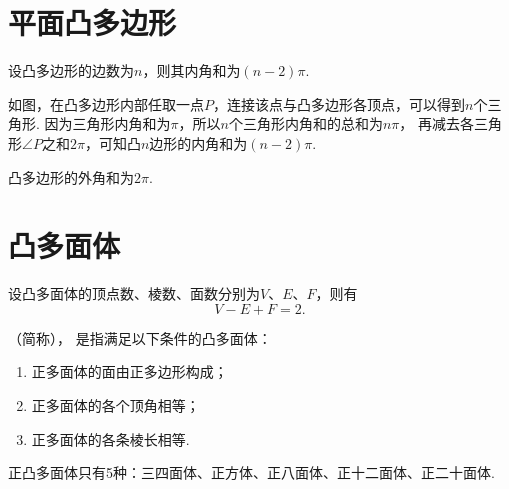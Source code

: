 \section{平面凸多边形}
\begin{theorem}
设凸多边形的边数为\(n\)，则其内角和为\((n-2)\pi\).
\end{theorem}
如图，在凸多边形内部任取一点\(P\)，连接该点与凸多边形各顶点，可以得到\(n\)个三角形.
因为三角形内角和为\(\pi\)，所以\(n\)个三角形内角和的总和为\(n\pi\)，
再减去各三角形\(\angle P\)之和\(2\pi\)，可知凸\(n\)边形的内角和为\((n-2)\pi\).
\begin{figure}[htb]
	\centering
	\caption{}
\end{figure}

\begin{theorem}
凸多边形的外角和为\(2\pi\).
\end{theorem}

\section{凸多面体}
\begin{theorem}[欧拉公式]
设凸多面体的顶点数、棱数、面数分别为\(V\)、\(E\)、\(F\)，则有\[
	V - E + F = 2.
\]
\end{theorem}

\begin{definition}
（简称），
是指满足以下条件的凸多面体：
\begin{enumerate}
	\item 正多面体的面由正多边形构成；
	\item 正多面体的各个顶角相等；
	\item 正多面体的各条棱长相等.
\end{enumerate}
\end{definition}

\begin{corollary}
正凸多面体只有5种：三四面体、正方体、正八面体、正十二面体、正二十面体.
\end{corollary}
